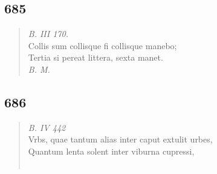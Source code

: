 \documentclass[11pt, a4paper]{report}
\begin{document}
            \subsection*{685}
      \begin{verse}
      \textit{B. III 170.} \\ Collis sum collisque fi collisque manebo; \\ Tertia si pereat littera, sexta manet. \\ \textit{B. M.} \\ 
      \end{verse}
  
            \subsection*{686}
      \begin{verse}
      \textit{B. IV 442} \\ Vrbs, quae tantum alias inter caput extulit urbes, \\ Quantum lenta solent inter viburna cupressi, \\ 
        ﻿\pagebreak 

\end{verse}
\end{document}

